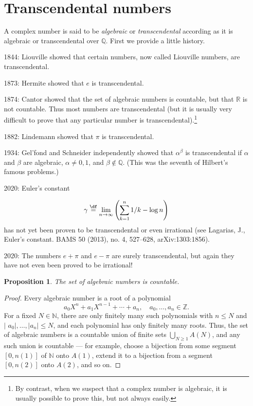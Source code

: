 \documentclass[a4paper,11pt,final,openany]{memoir}
\newtheorem{proposition}[X]{Proposition}
\theoremstyle{nonumberplain}
\newtheorem{proof}{Proof.}
\begin{document}
\section{Transcendental numbers}

\label{tranum}

A complex number is said to be \emph{algebraic\/}%
or \emph{transcendental\/}%
according as it is algebraic or transcendental over $\mathbb{Q}$. First we
provide a little history.

1844: Liouville showed that certain numbers, now called Liouville numbers, are transcendental.

1873: Hermite showed that $e$ is transcendental.

1874: Cantor showed that the set of algebraic numbers is countable, but that
$\mathbb{R}$ is not countable. Thus most numbers are transcendental (but it is
usually very difficult to prove that any particular number is
transcendental).\footnote{By contrast, when we suspect that a complex number
is algebraic, it is usually possible to prove this, but not always easily.}

1882: Lindemann showed that $\pi$ is transcendental.

1934: Gel'fond and Schneider independently showed that $\alpha^{\beta}$ is
transcendental if $\alpha$ and $\beta$ are algebraic, $\alpha\neq0,1$, and
$\beta\notin\mathbb{Q}$. (This was the seventh of Hilbert's famous problems.)

2020: Euler's constant%

\[
\gamma\overset{\df}{=}\lim_{n\rightarrow\infty}\left(
\sum_{k=1}^{n}1/k-\log n\right)
\]
has not yet been proven to be transcendental or even irrational (see Lagarias,
J., Euler's constant. BAMS 50 (2013), no. 4, 527--628, arXiv:1303:1856).

2020: The numbers $e+\pi$ and $e-\pi$ are surely transcendental, but again
they have not even been proved to be irrational!

\begin{proposition}
\label{ef22}The set of algebraic numbers is countable.
\end{proposition}

\begin{proof}
Every algebraic number is a root of a polynomial%
\[
a_{0}X^{n}+a_{1}X^{n-1}+\cdots+a_{n},\quad a_{0},\ldots,a_{n}\in\mathbb{Z}{}.
\]
For a fixed $N\in\mathbb{N}{}$, there are only finitely many such polynomials
with $n\leq N$ and
$\vert$%
$a_{0}|,\ldots,|a_{n}|\leq N$, and each polynomial has only finitely many
roots. Thus, the set of algebraic numbers is a countable union of finite sets
$\bigcup_{N\geq1}A(N)$, and any such union is countable --- for example,
choose a bijection from some segment $[0,n(1)]$ of $\mathbb{N}{}$ onto $A(1)$,
extend it to a bijection from a segment $[0,n(2)]$ onto $A(2)$, and so on.
\end{proof}
\end{document}
